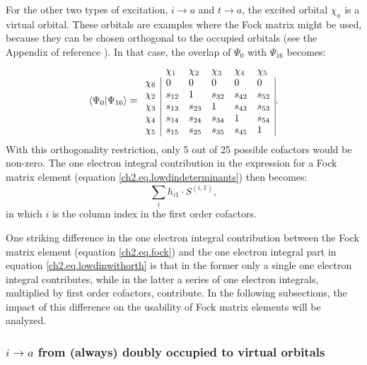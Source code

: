 For the other two types of excitation, $i \rightarrow a$ and $t \rightarrow a$, the excited orbital $\chi_a$ is a virtual orbital. These orbitals are examples where the Fock matrix might be used, because they can be chosen orthogonal to the occupied orbitals (see the Appendix of reference \cite{koos1}). In that case, the overlap of $\Psi_0$ with $\Psi_{16}$ becomes:
\begin{equation}
\left < \Psi_0 | \Psi_{16} \right> =
\begin{array}{llllll}
 &  \chi_1 & \chi_2 & \chi_3 & \chi_4 & \chi_5 \\
 \chi_6 & \multicolumn{1}{|l}{ 0 } & 0 & 0 & 0 & \multicolumn{1}{l|}{ 0 } \\
 \chi_2 & \multicolumn{1}{|l}{ s_{12} } & 1 & s_{32} & s_{42} & \multicolumn{1}{l|}{ s_{52} } \\
 \chi_3 & \multicolumn{1}{|l}{ s_{13} } & s_{23} & 1 & s_{43} & \multicolumn{1}{l|}{ s_{53} } \\
 \chi_4 & \multicolumn{1}{|l}{ s_{14} } & s_{24} & s_{34} & 1 & \multicolumn{1}{l|}{ s_{54} } \\
 \chi_5 & \multicolumn{1}{|l}{ s_{15} } & s_{25} & s_{35} & s_{45} & \multicolumn{1}{l|}{ 1 }
\end{array}.
\label{ch2.eq.s016go}
\end{equation}
With this orthogonality restriction, only 5 out of 25 possible cofactors would be non-zero. The one electron integral contribution in the expression for a Fock matrix element (equation \ref{ch2.eq.lowdindeterminants}) then becomes:
\begin{equation}
\sum_{i} h_{i1} \cdot S^{(i,1)},
\label{ch2.eq.lowdinwithorth}
\end{equation}
in which $i$ is the column index in the first order cofactors. 

One striking difference in the one electron integral contribution between the Fock matrix element (equation \ref{ch2.eq.fock}) and the one electron integral part in equation \ref{ch2.eq.lowdinwithorth} is that in the former only a single one electron integral contributes, while in the latter a series of one electron integrals, multiplied by first order cofactors, contribute. In the following subsections, the impact of this difference on the usability of Fock matrix elements will be analyzed.

\subsubsection{\label{ch2.sec.i-a}$i \rightarrow a$ from (always) doubly occupied to virtual orbitals}

